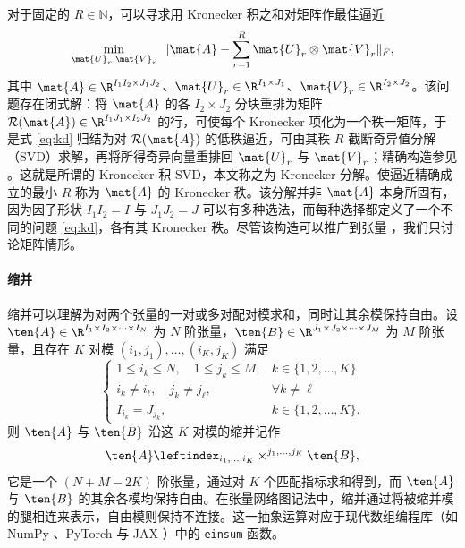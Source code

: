 对于固定的 $R \in \mathbb{N}$，可以寻求用 Kronecker 积之和对矩阵作最佳逼近
\begin{equation}
\label{eq:kd}
\min_{\mat{U}_r,\mat{V}_r}\ \| \mat{A}-\sum_{r=1}^{R}\mat{U}_r\otimes\mat{V}_r\|_F,
\end{equation}
其中 $\mat{A}\in\R^{I_1I_2\times J_1J_2}$、$\mat{U}_r\in\R^{I_1\times J_1}$、$\mat{V}_r\in\R^{I_2\times J_2}$。该问题存在闭式解：将 $\mat{A}$ 的各 $I_2\times J_2$ 分块重排为矩阵 $\mathcal{R}(\mat{A})\in\R^{I_1J_1\times I_2J_2}$ 的行，可使每个 Kronecker 项化为一个秩一矩阵，于是式 \eqref{eq:kd} 归结为对 $\mathcal{R}(\mat{A})$ 的低秩逼近，可由其秩 $R$ 截断奇异值分解（SVD）求解，再将所得奇异向量重排回 $\mat{U}_r$ 与 $\mat{V}_r$；精确构造参见 \cite{golubvanloan}。这就是所谓的 Kronecker 积 SVD，本文称之为 Kronecker 分解。使逼近精确成立的最小 $R$ 称为 $\mat{A}$ 的 Kronecker 秩。该分解并非 $\mat{A}$ 本身所固有，因为因子形状 $I_1I_2=I$ 与 $J_1J_2=J$ 可以有多种选法，而每种选择都定义了一个不同的问题 \eqref{eq:kd}，各有其 Kronecker 秩。尽管该构造可以推广到张量 \cite{batselier2017ktd}，我们只讨论矩阵情形。


\paragraph{缩并} 缩并可以理解为对两个张量的一对或多对配对模求和，同时让其余模保持自由。设 $\ten{A}\in\R^{I_1\times I_2\times \cdots\times I_N}$ 为 $N$ 阶张量，$\ten{B}\in\R^{J_1\times J_2 \times \cdots\times J_M}$ 为 $M$ 阶张量，且存在 $K$ 对模 $(i_1,j_1),\ldots,(i_K,j_K)$ 满足
\begin{equation}
\left\{
\begin{array}{ll}
  1\le i_k\le N, \quad 1\le j_k\le M,  &  k\in\{1,2,\ldots,K\} \\
  i_k \neq i_\ell, \quad  j_k\neq j_\ell, &  \forall k \neq \ell \\
  I_{i_k}=J_{j_k}, & k\in \{1,2,\ldots,K\}.
\end{array}
\right.
\end{equation}
则 $\ten{A}$ 与 $\ten{B}$ 沿这 $K$ 对模的缩并记作
\begin{equation}
    \ten{A}\leftindex_{i_1,\ldots,i_K}\times^{j_1,\ldots,j_K}\ten{B},
\end{equation}
它是一个 $(N+M-2K)$ 阶张量，通过对 $K$ 个匹配指标求和得到，而 $\ten{A}$ 与 $\ten{B}$ 的其余各模均保持自由。在张量网络图记法中，缩并通过将被缩并模的腿相连来表示，自由模则保持不连接。这一抽象运算对应于现代数组编程库（如 NumPy \cite{harris2020numpy}、PyTorch \cite{paszke2019pytorch} 与 JAX \cite{bradbury2018jax}）中的 \texttt{einsum} 函数。

